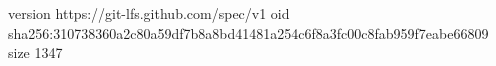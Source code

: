 version https://git-lfs.github.com/spec/v1
oid sha256:310738360a2c80a59df7b8a8bd41481a254c6f8a3fc00c8fab959f7eabe66809
size 1347
